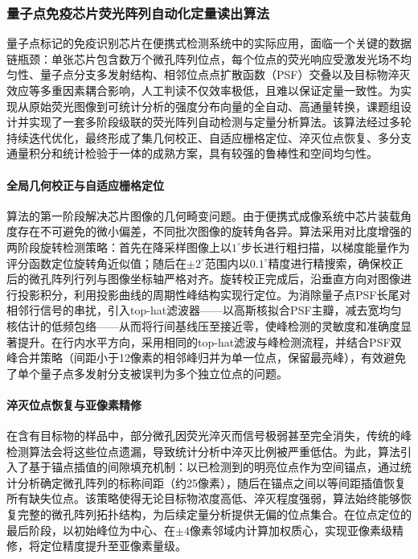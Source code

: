 \documentclass[12pt,a4paper]{article}
\begin{document}
\subsubsection{量子点免疫芯片荧光阵列自动化定量读出算法}

量子点标记的免疫识别芯片在便携式检测系统中的实际应用，面临一个关键的数据链瓶颈：单张芯片包含数万个微孔阵列位点，每个位点的荧光响应受激发光场不均匀性、量子点分支多发射结构、相邻位点点扩散函数（PSF）交叠以及目标物淬灭效应等多重因素耦合影响，人工判读不仅效率极低，且难以保证定量一致性。为实现从原始荧光图像到可统计分析的强度分布向量的全自动、高通量转换，课题组设计并实现了一套多阶段级联的荧光阵列自动检测与定量分析算法。该算法经过多轮持续迭代优化，最终形成了集几何校正、自适应栅格定位、淬灭位点恢复、多分支通量积分和统计检验于一体的成熟方案，具有较强的鲁棒性和空间均匀性。

\paragraph{全局几何校正与自适应栅格定位}\mbox{}

算法的第一阶段解决芯片图像的几何畸变问题。由于便携式成像系统中芯片装载角度存在不可避免的微小偏差，不同批次图像的旋转角各异。算法采用对比度增强的两阶段旋转检测策略：首先在降采样图像上以$1^\circ$步长进行粗扫描，以梯度能量作为评分函数定位旋转角近似值；随后在$\pm 2^\circ$范围内以$0.1^\circ$精度进行精搜索，确保校正后的微孔阵列行列与图像坐标轴严格对齐。旋转校正完成后，沿垂直方向对图像进行投影积分，利用投影曲线的周期性峰结构实现行定位。为消除量子点PSF长尾对相邻行信号的串扰，引入top-hat滤波器——以高斯核拟合PSF主瓣，减去宽均匀核估计的低频包络——从而将行间基线压至接近零，使峰检测的灵敏度和准确度显著提升。在行内水平方向，采用相同的top-hat滤波与峰检测流程，并结合PSF双峰合并策略（间距小于12像素的相邻峰归并为单一位点，保留最亮峰），有效避免了单个量子点多发射分支被误判为多个独立位点的问题。

\paragraph{淬灭位点恢复与亚像素精修}\mbox{}

在含有目标物的样品中，部分微孔因荧光淬灭而信号极弱甚至完全消失，传统的峰检测算法会将这些位点遗漏，导致统计分析中淬灭比例被严重低估。为此，算法引入了基于锚点插值的间隙填充机制：以已检测到的明亮位点作为空间锚点，通过统计分析确定微孔阵列的标称间距（约25像素），随后在锚点之间以等间距插值恢复所有缺失位点。该策略使得无论目标物浓度高低、淬灭程度强弱，算法始终能够恢复完整的微孔阵列拓扑结构，为后续定量分析提供无偏的位点集合。在位点定位的最后阶段，以初始峰位为中心、在$\pm 4$像素邻域内计算加权质心，实现亚像素级精修，将定位精度提升至亚像素量级。
\end{document}
